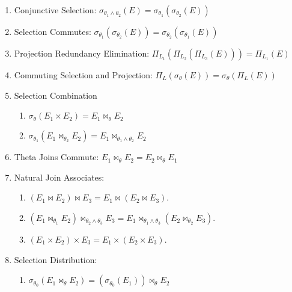 \documentclass[legalpaper,10pt]{article}
\begin{document}
\begin{enumerate}
\setlength\itemsep{0.9em}
\item Conjunctive Selection:
$\sigma_{\theta_{1} \wedge \theta_{2}}(E) = \sigma_{\theta_{1}}(\sigma_{\theta_{2}}(E))$

\item Selection Commutes:
 $\sigma_{\theta_{1}}(\sigma_{\theta_{2}}(E)) = \sigma_{\theta_{2}}(\sigma_{\theta_{1}}(E))$

\item Projection Redundancy Elimination:
 $\Pi_{L_{1}}(\Pi_{L_{2}}(\Pi_{L_{3}}(E))) = \Pi_{L_{1}}(E)$

\item Commuting Selection and Projection: $\Pi_{L}(\sigma_{\theta}(E)) = \sigma_{\theta}(\Pi_{L}(E))$

\item Selection Combination

\begin{enumerate}

\item $\sigma_{\theta}(E_{1} \times E_{2}) = E_{1} \bowtie_{\theta} E_{2}$

\item $\sigma_{\theta_{1}}( E_{1} \bowtie_{\theta_{2}} E_{2}) = E_{1} \bowtie_{\theta_{1}\wedge\theta_{2}} E_{2}$
\end{enumerate}


\item Theta Joins Commute:
$E_{1} \bowtie_{\theta} E_{2} = E_{2} \bowtie_{\theta} E_{1}$

\item Natural Join Associates:
\begin{enumerate}

\item $(E_{1} \bowtie E_{2}) \bowtie E_{3} = E_{1} \bowtie (E_{2} \bowtie E_{3})$. 

\item $(E_{1} \bowtie_{\theta_{1}} E_{2}) \bowtie_{\theta_{2}\wedge\theta_{3}} E_{3} = E_{1} \bowtie_{\theta_{1}\wedge\theta_{3}} (E_{2} \bowtie_{\theta_{2}} E_{3})$. 

\item $(E_{1} \times E_{2}) \times E_{3} = E_{1} \times (E_{2} \times E_{3})$. 
\end{enumerate}


\item Selection Distribution:
\begin{enumerate}
\item $\sigma_{\theta_{0}}(E_{1} \bowtie_{\theta} E_{2}) = (\sigma_{\theta_{0}}(E_{1})) \bowtie_{\theta} E_{2}$ 


\end{enumerate}
\end{enumerate}
\end{document}
